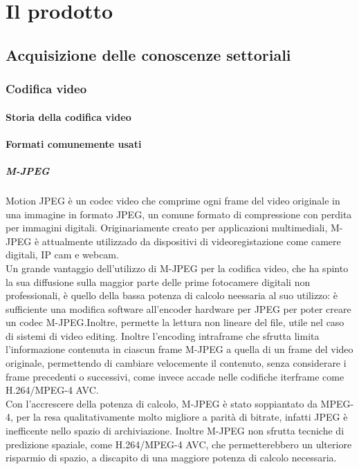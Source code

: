 \chapter{Il prodotto\label{cap:ilprodotto}}
\section{Acquisizione delle conoscenze settoriali}
   \subsection{Codifica video}
      \subsubsection{Storia della codifica video}
      \subsubsection{Formati comunemente usati}
         \paragraph{M-JPEG}
         Motion JPEG  è un codec video che comprime ogni frame del video originale in una immagine in formato JPEG, un comune formato di compressione con perdita per immagini digitali. Originariamente creato per applicazioni multimediali, M-JPEG è attualmente utilizzado da dispositivi di videoregistazione come camere digitali, IP cam e webcam.
         \\
         Un grande vantaggio dell'utilizzo di M-JPEG per la codifica video, che ha spinto la sua diffusione sulla maggior parte delle prime fotocamere digitali non professionali, è quello della bassa potenza di calcolo neessaria al suo utilizzo: è sufficiente una modifica software all'encoder hardware per JPEG per poter creare un codec M-JPEG.\@ Inoltre, permette la lettura non lineare del file, utile nel caso di sistemi di video editing. Inoltre l'encoding intraframe che sfrutta limita l'informazione contenuta in ciascun frame M-JPEG a quella di un frame del video originale, permettendo di cambiare velocemente il contenuto, senza considerare i frame precedenti o successivi, come invece accade nelle codifiche iterframe come H.264/MPEG-4 AVC.\@
         \\
         Con l'accrescere della potenza di calcolo, M-JPEG  è stato soppiantato da MPEG-4, per la resa qualitativamente molto migliore a parità di bitrate, infatti JPEG è inefficente nello spazio di archiviazione. Inoltre M-JPEG non sfrutta tecniche di predizione spaziale, come H.264/MPEG-4 AVC, che permetterebbero un ulteriore risparmio di spazio, a discapito di una maggiore potenza di calcolo necessaria.


